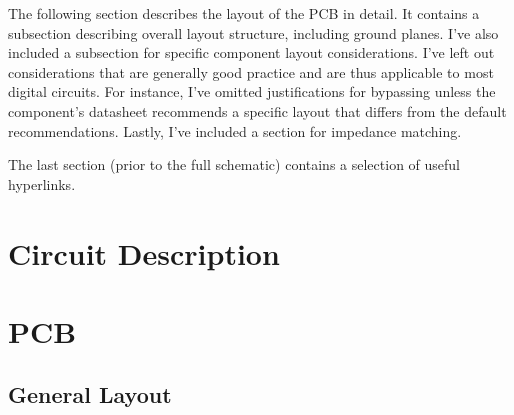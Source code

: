 \documentclass{default}
\begin{document}
The following section describes the layout of the PCB in detail. It contains a subsection describing
overall layout structure, including ground planes. I've also included a subsection for specific
component layout considerations. I've left out considerations that are generally good practice and
are thus applicable to most digital circuits. For instance, I've omitted justifications for
bypassing unless the component's datasheet recommends a specific layout that differs from the
default recommendations. Lastly, I've included a section for impedance matching.

The last section (prior to the full schematic) contains a selection of useful hyperlinks.

\chapter{Circuit Description}
\label{cha:circuit}











\chapter{PCB}
\section{General Layout}
\end{document}
